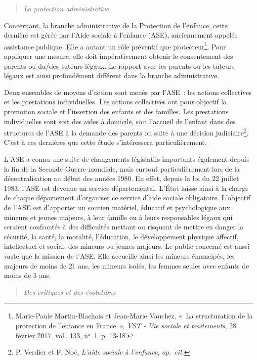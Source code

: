 \documentclass[
  12,
  a4paper,
]{report}
\begin{document}
\begin{quote}
\emph{La protection administrative}
\end{quote}

Concernant, la branche administrative de la Protection de l'enfance,
cette dernière est gérée par l'Aide sociale à l'enfance (ASE),
anciennement appelée assistance publique. Elle a autant un rôle
préventif que protecteur\footnote{Marie-Paule Martin-Blachais et
  Jean-Marie Vauchez, {«~La structuration de la protection de l'enfance
  en France~»}, \emph{VST - Vie sociale et traitements}, 28 février
  2017, vol.~133, nᵒ~1, p. 13‑18.}. Pour appliquer une mesure, elle doit
impérativement obtenir le consentement des parents ou du/des tuteurs
légaux. Le rapport avec les parents ou les tuteurs légaux est ainsi
profondément différent dans la branche administrative.

Deux ensembles de moyens d'action sont menés par l'ASE~: les actions
collectives et les prestations individuelles. Les actions collectives
ont pour objectif la promotion sociale et l'insertion des enfants et des
familles. Les prestations individuelles sont soit des aides à domicile,
soit l'accueil de l'enfant dans des structures de l'ASE à la demande des
parents ou suite à une décision judiciaire\footnote{P. Verdier et F.
  Noé, \emph{L'aide sociale à l'enfance}, \emph{op.~cit.}}. C'est à ces
dernières que cette étude s'intéressera particulièrement.

L'ASE a connu une suite de changements législatifs importants également
depuis la fin de la Seconde Guerre mondiale, mais surtout
particulièrement lors de la décentralisation au début des années 1980.
En effet, depuis la loi du 22 juillet 1983, l'ASE est devenue un service
départemental. L'État laisse ainsi à la charge de chaque département
d'organiser ce service d'aide sociale obligatoire. L'objectif de l'ASE
est d'apporter un soutien matériel, éducatif et psychologique aux
mineurs et jeunes majeurs, à leur famille ou à leurs responsables légaux
qui seraient confrontés à des difficultés mettant ou risquant de mettre
en danger la sécurité, la santé, la moralité, l'éducation, le
développement physique affectif, intellectuel et social, des mineurs ou
jeunes majeurs. Le public concerné est aussi vaste que la mission de
l'ASE. Elle accueille ainsi les mineurs émancipés, les majeurs de moins
de 21 ans, les mineurs isolés, les femmes seules avec enfants de moins
de 3 ans.

\begin{quote}
\emph{Des critiques et des évolutions}
\end{quote}
\end{document}
